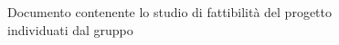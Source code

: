 Documento contenente lo studio di fattibilità del progetto \progetto \\individuati dal gruppo \gruppo
